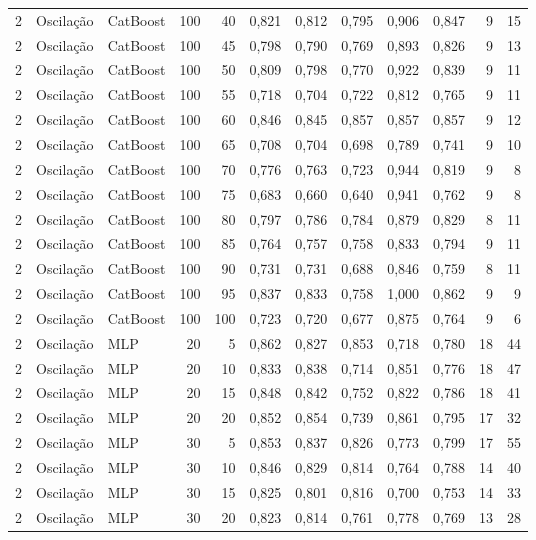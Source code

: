 \begin{longtable}{@{}rllrrrrrrrrr@{}}
2 & Oscilação & CatBoost & 100 & 40 & 0,821 & 0,812 & 0,795 & 0,906 & 0,847 & 9 & 15 \\
2 & Oscilação & CatBoost & 100 & 45 & 0,798 & 0,790 & 0,769 & 0,893 & 0,826 & 9 & 13 \\
2 & Oscilação & CatBoost & 100 & 50 & 0,809 & 0,798 & 0,770 & 0,922 & 0,839 & 9 & 11 \\
2 & Oscilação & CatBoost & 100 & 55 & 0,718 & 0,704 & 0,722 & 0,812 & 0,765 & 9 & 11 \\
2 & Oscilação & CatBoost & 100 & 60 & 0,846 & 0,845 & 0,857 & 0,857 & 0,857 & 9 & 12 \\
2 & Oscilação & CatBoost & 100 & 65 & 0,708 & 0,704 & 0,698 & 0,789 & 0,741 & 9 & 10 \\
2 & Oscilação & CatBoost & 100 & 70 & 0,776 & 0,763 & 0,723 & 0,944 & 0,819 & 9 & 8 \\
2 & Oscilação & CatBoost & 100 & 75 & 0,683 & 0,660 & 0,640 & 0,941 & 0,762 & 9 & 8 \\
2 & Oscilação & CatBoost & 100 & 80 & 0,797 & 0,786 & 0,784 & 0,879 & 0,829 & 8 & 11 \\
2 & Oscilação & CatBoost & 100 & 85 & 0,764 & 0,757 & 0,758 & 0,833 & 0,794 & 9 & 11 \\
2 & Oscilação & CatBoost & 100 & 90 & 0,731 & 0,731 & 0,688 & 0,846 & 0,759 & 8 & 11 \\
2 & Oscilação & CatBoost & 100 & 95 & 0,837 & 0,833 & 0,758 & 1,000 & 0,862 & 9 & 9 \\
2 & Oscilação & CatBoost & 100 & 100 & 0,723 & 0,720 & 0,677 & 0,875 & 0,764 & 9 & 6 \\
2 & Oscilação & MLP & 20 & 5 & 0,862 & 0,827 & 0,853 & 0,718 & 0,780 & 18 & 44 \\
2 & Oscilação & MLP & 20 & 10 & 0,833 & 0,838 & 0,714 & 0,851 & 0,776 & 18 & 47 \\
2 & Oscilação & MLP & 20 & 15 & 0,848 & 0,842 & 0,752 & 0,822 & 0,786 & 18 & 41 \\
2 & Oscilação & MLP & 20 & 20 & 0,852 & 0,854 & 0,739 & 0,861 & 0,795 & 17 & 32 \\
2 & Oscilação & MLP & 30 & 5 & 0,853 & 0,837 & 0,826 & 0,773 & 0,799 & 17 & 55 \\
2 & Oscilação & MLP & 30 & 10 & 0,846 & 0,829 & 0,814 & 0,764 & 0,788 & 14 & 40 \\
2 & Oscilação & MLP & 30 & 15 & 0,825 & 0,801 & 0,816 & 0,700 & 0,753 & 14 & 33 \\
2 & Oscilação & MLP & 30 & 20 & 0,823 & 0,814 & 0,761 & 0,778 & 0,769 & 13 & 28 \\

\end{longtable}
